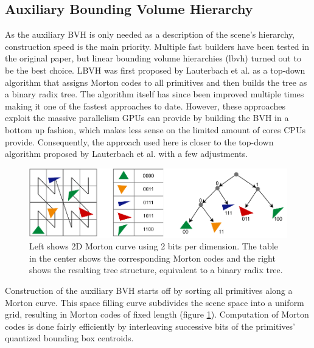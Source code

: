 \subsection{Auxiliary Bounding Volume Hierarchy}
\label{aux}
As the auxiliary BVH is only needed as a description of the scene's hierarchy, construction speed is the main priority. Multiple fast builders have been tested in the original paper\cite{hendrich_parallel_2017}, but linear bounding volume hierarchies (\acrshort{lbvh}) turned out to be the best choice. LBVH was first proposed by Lauterbach et al.\cite{lauterbach09lbvh} as a top-down algorithm that assigns Morton codes to all primitives and then builds the tree as a binary radix tree. The algorithm itself has since been improved multiple times\cite{karras12lbvh,apetrei14lbvh,chitalu20lbvh} making it one of the fastest approaches to date\cite{meister21survey}. However, these approaches exploit the massive parallelism GPUs can provide by building the BVH in a bottom up fashion, which makes less sense on the limited amount of cores CPUs provide. Consequently, the approach used here is closer to the top-down algorithm proposed by Lauterbach et al.\cite{lauterbach09lbvh} with a few adjustments. 
\begin{figure}[H]
    \centering
    \includegraphics[width=400pt]{images/morton_curve.pdf}
    \caption{Left shows 2D Morton curve using 2 bits per dimension. The table in the center shows the corresponding Morton codes and the right shows the resulting tree structure, equivalent to a binary radix tree.}
    \label{fig:morton}
\end{figure}
Construction of the auxiliary BVH starts off by sorting all primitives along a Morton curve\cite{morton66curve}. This space filling curve subdivides the scene space into a uniform grid, resulting in Morton codes of fixed length (figure \ref{fig:morton}). Computation of Morton codes is done fairly efficiently by interleaving successive bits of the primitives' quantized bounding box centroids.

